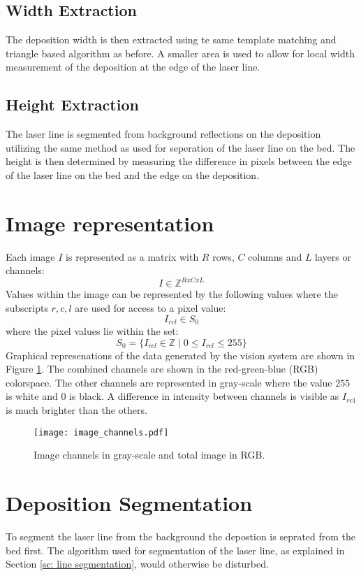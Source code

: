 \subsection*{Width Extraction}
The deposition width is then extracted using te same template matching and triangle based algorithm as before. A smaller area is used to allow for local width measurement of the deposition at the edge of the laser line. 

\subsection*{Height Extraction}
The laser line is segmented from background reflections on the deposition utilizing the same method as used for seperation of the laser line on the bed. The height is then determined by measuring the difference in pixels between the edge of the laser line on the bed and the edge on the deposition. 


\section{Image representation}
Each image $I$ is represented as a matrix with $R$ rows, $C$ columns and $L$ layers or channels:
\begin{equation}
I \in \mathbb{Z}^{RxCxL}
\end{equation}
Values within the image can be represented by the following values where the subscripts $r,c,l$ are used for access to a pixel value:
\begin{equation}
I_{rcl} \in S_0 
\end{equation}
where the pixel values lie within the set:
\begin{equation}
S_0 = \{ I_{rcl} \in  \mathbb{Z} \mid 0 \leq I_{rcl} \leq 255 \}
\end{equation}
Graphical represenations of the data generated by the vision system are shown in Figure \ref{fig: image_channels}. The combined channels are shown in the red-green-blue (RGB) colorspace. The other channels are represented in gray-scale where the value $255$ is white and $0$ is black. A difference in intensity between channels is visible as $I_{rc1}$ is much brighter than the others.
\begin{figure}[!ht]
\centering
\texttt{[image: image\_channels.pdf]} 
\caption{Image channels in gray-scale and total image in RGB.}
\label{fig: image_channels}
\end{figure}


\section{Deposition Segmentation}
To segment the laser line from the background the depostion is seprated from the bed first. The algorithm used for segmentation of the laser line, as explained in Section \ref{sc: line segmentation}, would otherwise be disturbed.

